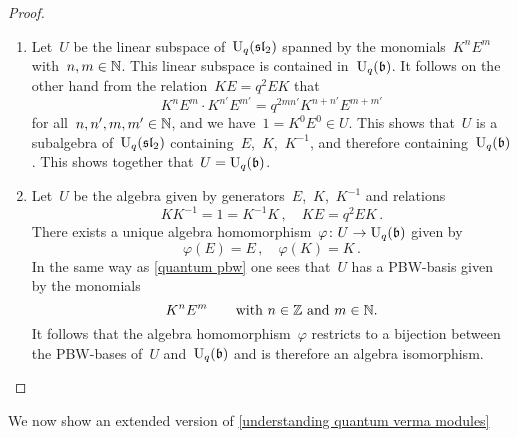 \documentclass[a4paper, 11pt, oneside]{scrartcl}
\begin{document}
\begin{proof}
  \leavevmode
  \begin{enumerate}
    \item
      Let~$U$ be the linear subspace of~$\operatorname{U}_q(\mathfrak{sl}_2)$ spanned by the monomials~$K^n E^m$ with~$n, m \in \mathbb{N}$.
      This linear subspace is contained in~$\operatorname{U}_q(\mathfrak{b})$.
      It follows on the other hand from the relation~$KE = q^2 EK$ that
      \[
        K^n E^m \cdot K^{n'} E^{m'}
        =
        q^{2 m n'} K^{n + n'} E^{m + m'}
      \]
      for all~$n, n', m, m' \in \mathbb{N}$, and we have~$1 = K^0 E^0 \in U$.
      This shows that~$U$ is a subalgebra of~$\operatorname{U}_q(\mathfrak{sl}_2)$ containing~$E$,~$K$,~$K^{-1}$, and therefore containing~$\operatorname{U}_q(\mathfrak{b})$.
      This shows together that~$U = \operatorname{U}_q(\mathfrak{b})$.
    \item
      Let~$U$ be the algebra given by generators~$E$,~$K$,~$K^{-1}$ and relations
      \[
        K K^{-1} = 1 = K^{-1} K \,,
        \quad
        KE = q^2 EK \,.
      \]
      There exists a unique algebra homomorphism~$\varphi \colon U \to \operatorname{U}_q(\mathfrak{b})$ given by
      \[
        \varphi(E) = E \,,
        \quad
        \varphi(K) = K \,.
      \]
      In the same way as \cref{quantum pbw} one sees that~$U$ has a PBW-basis given by the monomials
      \[
        K^n E^m
        \qquad
        \text{with~$n \in \mathbb{Z}$ and~$m \in \mathbb{N}$.}
      \]
      It follows that the algebra homomorphism~$\varphi$ restricts to a bijection between the PBW-bases of~$U$ and~$\operatorname{U}_q(\mathfrak{b})$ and is therefore an algebra isomorphism.
    \qedhere
  \end{enumerate}
\end{proof}

We now show an extended version of \cref{understanding quantum verma modules}
\end{document}
